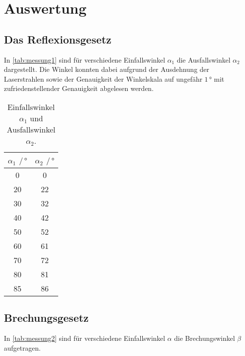 \section{Auswertung}
\label{sec:auswertung}

\subsection{Das Reflexionsgesetz}

In \autoref{tab:messung1} sind für verschiedene Einfallswinkel $\alpha_1$ die Ausfallswinkel $\alpha_2$ dargestellt.
Die Winkel konnten dabei aufgrund der Ausdehnung der Laserstrahlen sowie der Genauigkeit der Winkelskala auf ungefähr $1 \,°$ mit zufriedenstellender Genauigkeit abgelesen werden.

\begin{table}[H]
    \centering
    \caption{Einfallswinkel $\alpha_1$ und Ausfallswinkel $\alpha_2$.}
    \label{tab:messung1}
    \begin{tabular}{S[table-format=2.0] S[table-format=2.0]}
      \toprule
        {$\alpha_1$ $\mathbin{/} \, \unit{\degree}$} & {$\alpha_2$ $\mathbin{/} \, \unit{\degree}$}\\
                    &               0 \\
        20              &              22 \\
        30              &              32 \\
        40              &              42 \\
        50              &              52 \\
        60              &              61 \\
        70              &              72 \\
        80              &              81 \\
        85              &              86 \\
    \bottomrule
    \end{tabular}
\end{table}

\newpage
\subsection{Brechungsgesetz}
\label{subsec:brechungsgesetz}

In \autoref{tab:messung2} sind für verschiedene Einfallswinkel $\alpha$ die Brechungswinkel $\beta$ aufgetragen.

